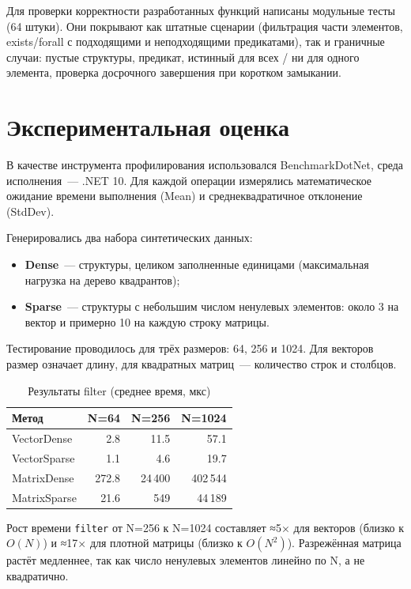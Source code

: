 \documentclass[a4paper]{article}
\begin{document}
Для проверки корректности разработанных функций написаны модульные тесты (64 штуки). Они покрывают как штатные сценарии (фильтрация части элементов, exists/forall с подходящими и неподходящими предикатами), так и граничные случаи: пустые структуры, предикат, истинный для всех / ни для одного элемента, проверка досрочного завершения при коротком замыкании.

\section{Экспериментальная оценка}

В качестве инструмента профилирования использовался BenchmarkDotNet, среда исполнения~--- .NET 10. Для каждой операции измерялись математическое ожидание времени выполнения (Mean) и среднеквадратичное отклонение (StdDev).

Генерировались два набора синтетических данных:
\begin{itemize}
    \item \textbf{Dense}~--- структуры, целиком заполненные единицами (максимальная нагрузка на дерево квадрантов);
    \item \textbf{Sparse}~--- структуры с небольшим числом ненулевых элементов: около 3 на вектор и примерно 10 на каждую строку матрицы.
\end{itemize}

Тестирование проводилось для трёх размеров: 64, 256 и 1024. Для векторов размер означает длину, для квадратных матриц~--- количество строк и столбцов.

\begin{table}[H]
\centering
\caption{Результаты filter (среднее время, мкс)}
\label{tab:filter}
\begin{tabular}{lrrr}
\toprule
Метод & N=64 & N=256 & N=1024 \\
\midrule
VectorDense  & 2.8 & 11.5 & 57.1 \\
VectorSparse & 1.1 & 4.6 & 19.7 \\
MatrixDense  & 272.8 & 24\,400 & 402\,544 \\
MatrixSparse & 21.6 & 549 & 44\,189 \\
\bottomrule
\end{tabular}
\end{table}

Рост времени \texttt{filter} от N=256 к N=1024 составляет ≈5× для векторов (близко к $O(N)$) и ≈17× для плотной матрицы (близко к $O(N^2)$). Разрежённая матрица растёт медленнее, так как число ненулевых элементов линейно по N, а не квадратично.
\end{document}
